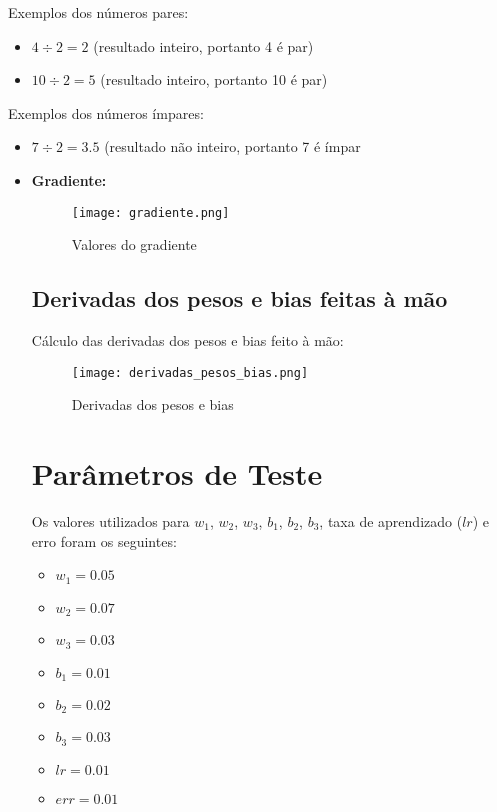 \documentclass{article}
\begin{document}
Exemplos dos números pares:

\begin{itemize}
\item $4 \div 2 = 2$ (resultado inteiro, portanto 4 é par)
\item $10 \div 2 = 5$ (resultado inteiro, portanto 10 é par)
\end{itemize}

Exemplos dos números ímpares:

\begin{itemize}
\item $7 \div 2 = 3.5$ (resultado não inteiro, portanto 7 é ímpar
\item \textbf{Gradiente:}

\begin{figure}[htbp]
\centering
\texttt{[image: gradiente.png]}
\caption{Valores do gradiente}
\label{fig:gradiente}
\end{figure}

\newpage

\subsection{Derivadas dos pesos e bias feitas à mão}

\begin{flushleft}
Cálculo das derivadas dos pesos e bias feito à mão:
\end{flushleft}

\begin{figure}[htbp]
\centering
\texttt{[image: derivadas\_pesos\_bias.png]}
\caption{Derivadas dos pesos e bias}
\label{fig:derivadas_pesos_bias}
\end{figure}

\section{Parâmetros de Teste}

\begin{flushleft}
Os valores utilizados para $w_1$, $w_2$, $w_3$, $b_1$, $b_2$, $b_3$, taxa de aprendizado ($lr$) e erro foram os seguintes:
\end{flushleft}

\begin{itemize}
\item $w_1 = 0.05$
\item $w_2 = 0.07$
\item $w_3 = 0.03$
\item $b_1 = 0.01$
\item $b_2 = 0.02$
\item $b_3 = 0.03$
\item $lr = 0.01$
\item $err = 0.01$
\end{itemize}


\end{itemize}
\end{document}
